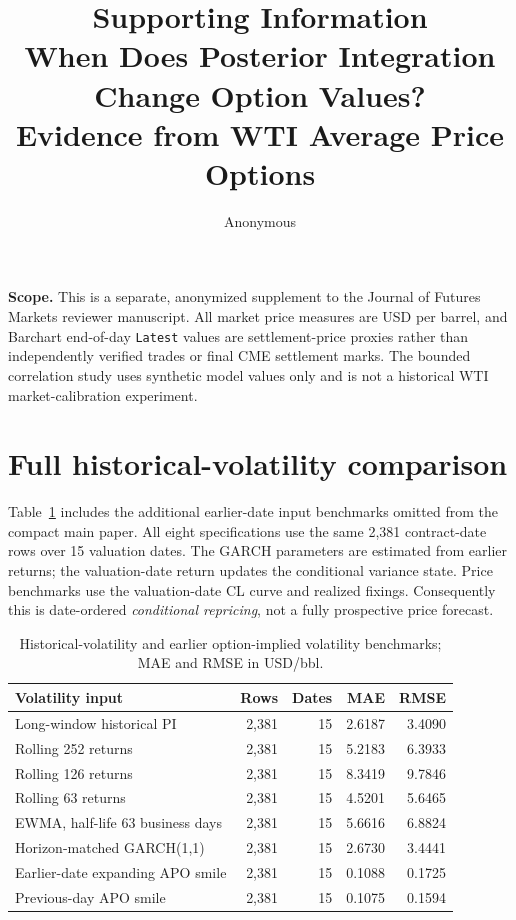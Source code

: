 \documentclass[10pt]{article}
\title{Supporting Information\\
When Does Posterior Integration Change Option Values?\\
Evidence from WTI Average Price Options}
\author{Anonymous}
\date{}
\begin{document}
\maketitle
\noindent\textbf{Scope.} This is a separate, anonymized supplement to the
Journal of Futures Markets reviewer manuscript. All market price measures
are USD per barrel, and Barchart end-of-day \texttt{Latest} values are
settlement-price proxies rather than independently verified trades or final
CME settlement marks. The bounded correlation study uses synthetic model
values only and is not a historical WTI market-calibration experiment.

\section{Full historical-volatility comparison}
Table~\ref{tab:s1} includes the additional earlier-date input benchmarks
omitted from the compact main paper. All eight specifications use the same
2,381 contract-date rows over 15 valuation dates. The GARCH parameters are
estimated from earlier returns; the valuation-date return updates the
conditional variance state. Price benchmarks use the valuation-date CL curve
and realized fixings. Consequently this is date-ordered \emph{conditional
repricing}, not a fully prospective price forecast.

\begin{table}[htbp]\centering\small
\caption{Historical-volatility and earlier option-implied volatility
benchmarks; MAE and RMSE in USD/bbl.}\label{tab:s1}
\begin{tabular}{lrrrr}\toprule
Volatility input & Rows & Dates & MAE & RMSE\\\midrule
Long-window historical PI & 2,381 & 15 & 2.6187 & 3.4090\\
Rolling 252 returns & 2,381 & 15 & 5.2183 & 6.3933\\
Rolling 126 returns & 2,381 & 15 & 8.3419 & 9.7846\\
Rolling 63 returns & 2,381 & 15 & 4.5201 & 5.6465\\
EWMA, half-life 63 business days & 2,381 & 15 & 5.6616 & 6.8824\\
Horizon-matched GARCH(1,1) & 2,381 & 15 & 2.6730 & 3.4441\\
Earlier-date expanding APO smile & 2,381 & 15 & 0.1088 & 0.1725\\
Previous-day APO smile & 2,381 & 15 & 0.1075 & 0.1594\\\bottomrule
\end{tabular}
\end{table}
\end{document}
